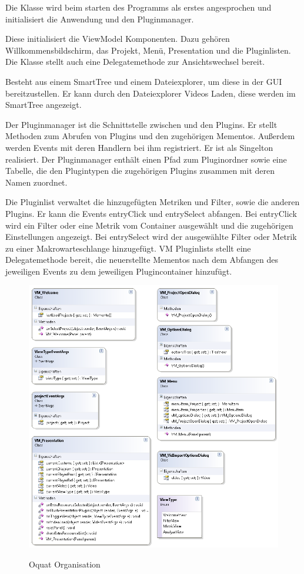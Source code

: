 Die Klasse wird beim starten des Programms als erstes angesprochen und initialisiert die Anwendung und den Pluginmanager.


Diese initialisiert die ViewModel Komponenten. Dazu gehören Willkommensbildschirm, das Projekt, Menü, Presentation und die Pluginlisten. Die Klasse stellt auch eine Delegatemethode zur Ansichtswechsel bereit.


Besteht aus einem SmartTree und einem Dateiexplorer, um diese in der GUI bereitzustellen. Er kann durch den Dateiexplorer Videos Laden, diese werden im SmartTree angezeigt.


Der Pluginmanager ist die Schnittstelle zwischen \projektTitel und den Plugins. Er stellt Methoden zum Abrufen von Plugins und den zugehörigen Mementos. Außerdem werden Events mit deren Handlern bei ihm registriert.  Er ist als Singelton realisiert. Der Pluginmanager enthält einen Pfad zum Pluginordner sowie eine Tabelle, die den Plugintypen die zugehörigen Plugins zusammen mit deren Namen zuordnet.


Die Pluginlist verwaltet die hinzugefügten Metriken und Filter, sowie die anderen Plugins. Er kann die Events entryClick und entrySelect abfangen. Bei entryClick wird ein Filter oder eine Metrik vom Container ausgewählt und die zugehörigen Einstellungen angezeigt. Bei entrySelect wird der ausgewählte Filter oder Metrik zu einer Makrowarteschlange hinzugefügt. VM Pluginlists stellt eine Delegatemethode bereit, die neuerstellte Mementos nach dem Abfangen des jeweiligen Events zu dem jeweiligen Plugincontainer hinzufügt.


\begin{figure}[h]
\noindent\includegraphics[width=\linewidth,height=\textheight,
keepaspectratio]{bilder/Klassendiagramm/VM2.png}
\label{}
\caption{Oquat Organisation}
\end{figure}

